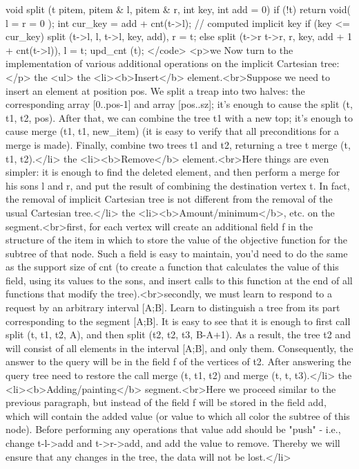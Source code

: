 void split (t pitem, pitem & l, pitem & r, int key, int add = 0) {
if (!t)
return void( l = r = 0 );
int cur_key = add + cnt(t->l); // computed implicit key
if (key <= cur_key)
split (t->l, l, t->l, key, add), r = t;
else
split (t->r t->r, r, key, add + 1 + cnt(t->l)), l = t;
upd_cnt (t);
}</code>
<p>we Now turn to the implementation of various additional operations on the implicit Cartesian tree:</p>
the <ul>
the <li><b>Insert</b> element.<br>Suppose we need to insert an element at position pos. We split a treap into two halves: the corresponding array [0..pos-1] and array [pos..sz]; it's enough to cause the split (t, t1, t2, pos). After that, we can combine the tree t1 with a new top; it's enough to cause merge (t1, t1, new_item) (it is easy to verify that all preconditions for a merge is made). Finally, combine two trees t1 and t2, returning a tree t merge (t, t1, t2).</li>
the <li><b>Remove</b> element.<br>Here things are even simpler: it is enough to find the deleted element, and then perform a merge for his sons l and r, and put the result of combining the destination vertex t. In fact, the removal of implicit Cartesian tree is not different from the removal of the usual Cartesian tree.</li>
the <li><b>Amount/minimum</b>, etc. on the segment.<br>first, for each vertex will create an additional field f in the structure of the item in which to store the value of the objective function for the subtree of that node. Such a field is easy to maintain, you'd need to do the same as the support size of cnt (to create a function that calculates the value of this field, using its values to the sons, and insert calls to this function at the end of all functions that modify the tree).<br>secondly, we must learn to respond to a request by an arbitrary interval [A;B]. Learn to distinguish a tree from its part corresponding to the segment [A;B]. It is easy to see that it is enough to first call split (t, t1, t2, A), and then split (t2, t2, t3, B-A+1). As a result, the tree t2 and will consist of all elements in the interval [A;B], and only them. Consequently, the answer to the query will be in the field f of the vertices of t2. After answering the query tree need to restore the call merge (t, t1, t2) and merge (t, t, t3).</li>
the <li><b>Adding/painting</b> segment.<br>Here we proceed similar to the previous paragraph, but instead of the field f will be stored in the field add, which will contain the added value (or value to which all color the subtree of this node). Before performing any operations that value add should be "push" - i.e., change t-l->add and t->r->add, and add the value to remove. Thereby we will ensure that any changes in the tree, the data will not be lost.</li>
